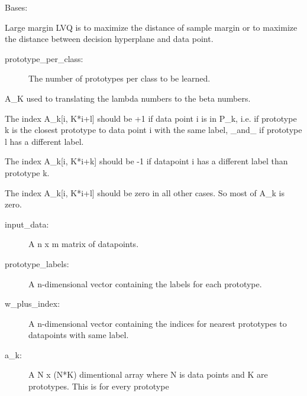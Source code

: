 \documentclass[letterpaper,10pt,english]{sphinxmanual}
\begin{document}
\begin{fulllineitems}
\label{\detokenize{index:lmlvq_distance.LMLVQ}}
Bases: 

Large margin LVQ is to maximize the distance of sample margin or
to maximize the distance between decision hyperplane and data point.
\begin{description}
\item[{prototype\_per\_class:}] \leavevmode
The number of prototypes per class to be learned.

\end{description}

\begin{fulllineitems}
\label{\detokenize{index:lmlvq_distance.LMLVQ.A_k}}
A\_K used to translating the lambda numbers to the beta numbers.

The index A\_k{[}i, K*i+l{]} should be +1 if data point i is in P\_k, i.e.
if prototype k is the closest prototype to data point i with the same
label, \_and\_ if prototype l has a different label.

The index A\_k{[}i, K*i+k{]} should be -1 if datapoint i has a different
label than prototype k.

The index A\_k{[}i, K*i+l{]} should be zero in all other
cases. So most of A\_k is zero.
\begin{description}
\item[{input\_data:}] \leavevmode
A n x m matrix of datapoints.

\item[{prototype\_labels:}] \leavevmode
A n-dimensional vector containing the labels for each
prototype.

\item[{w\_plus\_index:}] \leavevmode
A n-dimensional vector containing the indices for nearest
prototypes to datapoints with same label.

\end{description}
\begin{description}
\item[{a\_k:}] \leavevmode
A N x (N*K) dimentional array where N is data points and K are
prototypes. This is for every prototype


\end{description}
\end{fulllineitems}
\end{fulllineitems}
\end{document}
